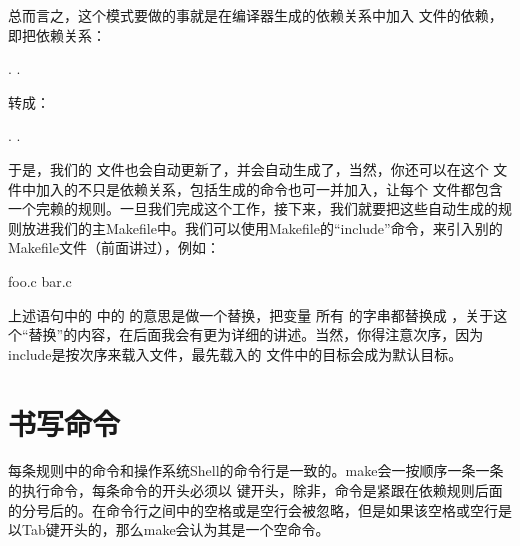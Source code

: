 \documentclass[a4paper,10pt]{sphinxmanual}
\begin{document}
总而言之，这个模式要做的事就是在编译器生成的依赖关系中加入  文件的依赖，即把依赖关系：

\begin{sphinxVerbatim}[commandchars=\\\{\}]
 . .
\end{sphinxVerbatim}

转成：

\begin{sphinxVerbatim}[commandchars=\\\{\}]
 . .
\end{sphinxVerbatim}

于是，我们的  文件也会自动更新了，并会自动生成了，当然，你还可以在这个  文件中加入的不只是依赖关系，包括生成的命令也可一并加入，让每个  文件都包含一个完赖的规则。一旦我们完成这个工作，接下来，我们就要把这些自动生成的规则放进我们的主Makefile中。我们可以使用Makefile的“include”命令，来引入别的Makefile文件（前面讲过），例如：

\begin{sphinxVerbatim}[commandchars=\\\{\}]
  foo.c bar.c

\end{sphinxVerbatim}

上述语句中的  中的  的意思是做一个替换，把变量
 所有  的字串都替换成  ，关于这个“替换”的内容，在后面我会有更为详细的讲述。当然，你得注意次序，因为include是按次序来载入文件，最先载入的  文件中的目标会成为默认目标。


\chapter{书写命令}
\label{\detokenize{recipes:id1}}\label{\detokenize{recipes::doc}}
每条规则中的命令和操作系统Shell的命令行是一致的。make会一按顺序一条一条的执行命令，每条命令的开头必须以  键开头，除非，命令是紧跟在依赖规则后面的分号后的。在命令行之间中的空格或是空行会被忽略，但是如果该空格或空行是以Tab键开头的，那么make会认为其是一个空命令。
\end{document}
